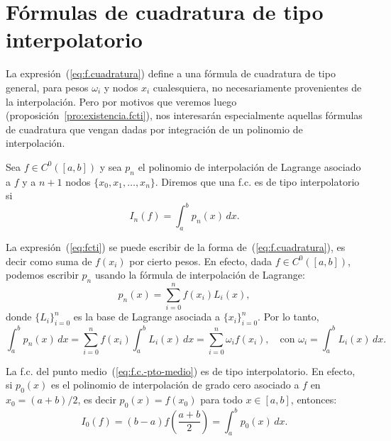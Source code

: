 \section{Fórmulas de cuadratura de tipo interpolatorio}
\label{sec:cuadratura-interpolatorio}

La expresión~(\ref{eq:f.cuadratura}) define a una fórmula de
cuadratura de tipo general, para pesos $\omega_i$ y nodos $x_i$
cualesquiera, no necesariamente provenientes de la interpolación.
Pero por motivos que veremos luego
(proposición~\ref{pro:existencia.fcti}), nos interesarán especialmente
aquellas fórmulas de cuadratura que vengan dadas por integración de un
polinomio de interpolación.
\begin{definition}
  Sea $f\in C^0([a,b])$ y sea $p_n$ el polinomio de interpolación de
  Lagrange asociado a $f$ y a $n+1$ nodos
  $\{x_0,x_1,\dots,x_n\}$. Diremos que una f.c. es de tipo
  interpolatorio si
  \begin{equation}
    \label{eq:fcti}
    I_n(f)=\int_a^b p_n(x)\, dx.
  \end{equation}
  \label{def:fcti}
\end{definition}

La expresión~(\ref{eq:fcti}) se puede escribir de la forma
de~(\ref{eq:f.cuadratura}), es decir como suma de $f(x_i)$ por
cierto pesos. En efecto, dada $f\in C^0([a,b])$, podemos escribir
$p_n$ usando la fórmula de interpolación de Lagrange:
\begin{equation*}
  p_n(x)=\sum_{i=0}^n f(x_i) L_i(x),
\end{equation*}
donde $\{L_i\}_{i=0}^n$ es la base de Lagrange asociada a
$\{x_i\}_{i=0}^n$. Por lo tanto,
\begin{equation*}
  \int_a^bp_n(x)\,dx = \sum_{i=0}^n f(x_i) \int_a^b L_i(x)\,dx
  =\sum_{i=0}^n \omega_i f(x_i), \quad \text{con } \omega_i=\int_a^b L_i(x)\,dx.
\end{equation*}

\begin{example}
  \label{ex:formula-pto-medio-interpol}
  La f.c. del punto medio~(\ref{eq:f.c.-pto-medio}) es de tipo
  interpolatorio. En efecto, si $p_0(x)$ es el polinomio de
  interpolación de grado cero asociado a $f$ en $x_0=(a+b)/2$, es
  decir $p_0(x)=f(x_0)$ para todo $x\in[a,b]$, entonces:
  \begin{equation*}
    I_0(f) = (b-a)f\left(\frac{a+b}{2}\right) = \int_a^b p_0(x)\,dx.
  \end{equation*}
\end{example}

